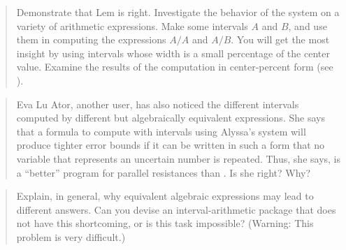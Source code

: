 \begin{quote}
 Demonstrate that Lem is right.
Investigate the behavior of the system on a variety of arithmetic
expressions. Make some intervals \( A \) and \( B \), and use them in computing the
expressions \( A / A \) and \( A / B \).  You will get the most insight by
using intervals whose width is a small percentage of the center value. Examine
the results of the computation in center-percent form (see ).
\end{quote}

\begin{quote}
 Eva Lu Ator, another user, has
also noticed the different intervals computed by different but algebraically
equivalent expressions. She says that a formula to compute with intervals using
Alyssa's system will produce tighter error bounds if it can be written in such
a form that no variable that represents an uncertain number is repeated.  Thus,
she says,  is a ``better'' program for parallel resistances than
.  Is she right?  Why?
\end{quote}

\begin{quote}
 Explain, in general, why
equivalent algebraic expressions may lead to different answers.  Can you devise
an interval-arithmetic package that does not have this shortcoming, or is this
task impossible?  (Warning: This problem is very difficult.)
\end{quote}
